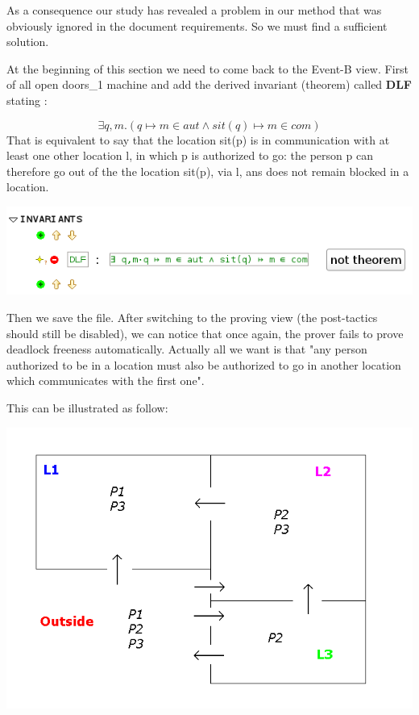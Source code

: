 As a consequence our study has revealed a problem in our method that was obviously ignored in the document requirements.
So we must find a sufficient solution.

At the beginning of this section we need to come back to the \textsf{Event-B view}.
First of all open doors\_1 machine and add the derived invariant (theorem) called \textbf{DLF} stating :

\[
\exists q,m.(q \mapsto m \in aut \land sit(q) \mapsto m \in com )
\]
That is equivalent to say that the location sit(p) is in communication with at least one other location l, in which p is authorized to go:
the person p can therefore go out of the the location sit(p), via l, ans does not remain blocked in a location.

\begin{center}
	\includegraphics[]{img/tutorial/tut_10_invariants2.png}
\end{center}

Then we save the file. After switching to the proving view (the post-tactics should still be disabled), we can notice that once again, the prover fails to prove deadlock freeness automatically. 
Actually all we want is that "any person authorized to be in a location must also be authorized to go in another location which communicates with the first one".

This can be illustrated as follow:
\begin{center}
	\includegraphics[]{img/tutorial/tut_10_graph.png}
\end{center}

